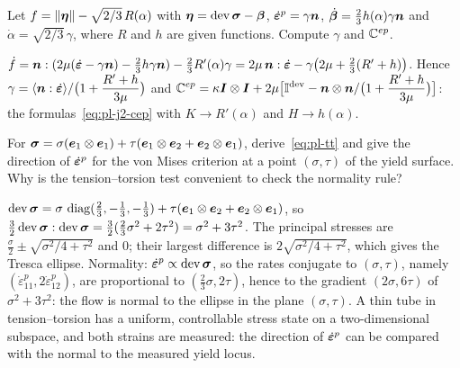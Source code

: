 \label{exo:pl-j2nl}
Let $f=\lVert \bm{\eta}\rVert-\sqrt{2/3}\,R(\alpha)$ with $\bm{\eta}=\operatorname{dev}\bm{\sigma}-\bm{\beta}$,
$\dot{\bm{\varepsilon}}^p=\gamma\bm{n}$, $\dot{\bm{\beta}}=\tfrac23h(\alpha)\gamma\bm{n}$ and
$\dot\alpha=\sqrt{2/3}\,\gamma$, where $R$ and $h$ are given functions.
Compute $\gamma$ and $\mathbb{C}^{ep}$.
\begin{solution}
$\dot f=\bm{n}:(2\mu(\dot{\bm{\varepsilon}}-\gamma\bm{n})-\tfrac23h\gamma\bm{n})-\tfrac23R'(\alpha)\gamma
=2\mu\,\bm{n}:\dot{\bm{\varepsilon}}-\gamma\bigl(2\mu+\tfrac23(R'+h)\bigr)$. Hence
$\displaystyle \gamma=\langle \bm{n}:\dot{\bm{\varepsilon}}\rangle/\bigl(1+\frac{R'+h}{3\mu}\bigr)$ and
$\displaystyle \mathbb{C}^{ep}=\kappa\bm{I}\otimes\bm{I}+2\mu\bigl[\mathbb{I}^{\mathrm{dev}}-\bm{n}\otimes\bm{n}/\bigl(1+\frac{R'+h}{3\mu}\bigr)\bigr]$:
the formulas~\eqref{eq:pl-j2-cep} with $K\to R'(\alpha)$ and $H\to h(\alpha)$.
\end{solution}

\label{exo:pl-tt}
For $\bm{\sigma}=\sigma(\bm{e}_1\otimes\bm{e}_1)+\tau(\bm{e}_1\otimes\bm{e}_2+\bm{e}_2\otimes\bm{e}_1)$,
derive~\eqref{eq:pl-tt} and give the direction of $\dot{\bm{\varepsilon}}^p$ for the von
Mises criterion at a point $(\sigma,\tau)$ of the yield surface. Why is the
tension--torsion test convenient to check the normality rule?
\begin{solution}
$\operatorname{dev}\bm{\sigma}=\sigma\,\operatorname{diag}(\tfrac23,-\tfrac13,-\tfrac13)+\tau(\bm{e}_1\otimes\bm{e}_2+\bm{e}_2\otimes\bm{e}_1)$,
so $\tfrac32\operatorname{dev}\bm{\sigma}:\operatorname{dev}\bm{\sigma}=\tfrac32(\tfrac23\sigma^2+2\tau^2)=\sigma^2+3\tau^2$.
The principal stresses are $\tfrac\sigma2\pm\sqrt{\sigma^2/4+\tau^2}$ and $0$;
their largest difference is $2\sqrt{\sigma^2/4+\tau^2}$, which gives the
Tresca ellipse. Normality: $\dot{\bm{\varepsilon}}^p\propto\operatorname{dev}\bm{\sigma}$, so the rates conjugate to
$(\sigma,\tau)$, namely $(\dot\varepsilon^p_{11},2\dot\varepsilon^p_{12})$, are
proportional to $(\tfrac23\sigma,2\tau)$, hence to the gradient $(2\sigma,6\tau)$
of $\sigma^2+3\tau^2$: the flow is normal to the ellipse in the plane
$(\sigma,\tau)$. A thin tube in tension--torsion has a
uniform, controllable stress state on a two-dimensional subspace, and both
strains are measured: the direction of $\dot{\bm{\varepsilon}}^p$ can be compared with the
normal to the measured yield locus.
\end{solution}

